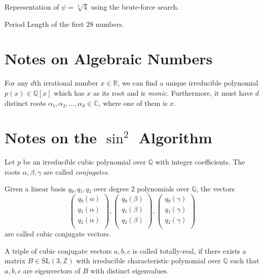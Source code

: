 \begin{table}[t]
  \caption{Representation of $ψ = \sqrt[3]{4}$ using the brute-force search.}
  \label{table:cube-root-4}
  \centering
  
\end{table}

\begin{table}[t]
  \caption{Period Length of the first $28$ numbers.}
  \centering
  
\end{table}

\section{Notes on Algebraic Numbers}

For any $d$th irrational number $x ∈ ℝ$, we can find a unique irreducible polynomial $p(x) ∈ ℚ[x]$
which has $x$ as its root and is \emph{monic}.
Furthermore, it must have $d$ distinct roots $α₁, α₂, \dots, α_d ∈ ℂ$,
where one of them is $x$.

\section{Notes on the $\sin^2$ Algorithm}

Let $p$ be an irreducible cubic polynomial over $ℚ$ with integer coefficients.
The roots $α, β, γ$ are called \emph{conjugates}.

Given a linear basis $q₀, q₁, q₂$ over degree $2$ polynomials over $ℚ$,
the vectors
\[
  \begin{pmatrix}
    q₀(α) \\
    q₁(α) \\
    q₂(α) \\
  \end{pmatrix},
  \begin{pmatrix}
    q₀(β) \\
    q₁(β) \\
    q₂(β) \\
  \end{pmatrix},
  \begin{pmatrix}
    q₀(γ) \\
    q₁(γ) \\
    q₂(γ) \\
  \end{pmatrix}
\]
are called cubic conjugate vectors.

A triple of cubic conjugate vectors $a, b, c$ is called totally-real, if there
exists a matrix $B ∈ \text{SL}(3, ℤ)$ with irreducible characteristic
polynomial over $ℚ$ such that $a, b, c$ are eigenvectors of $B$ with distinct
eigenvalues.

